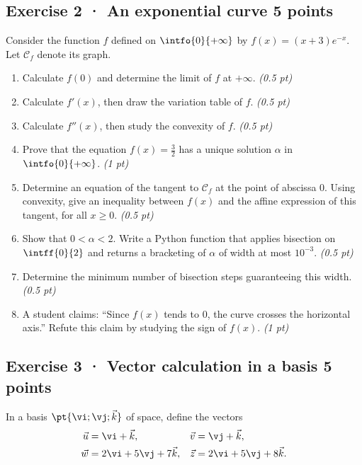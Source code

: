 \subsection*{Exercise 2 · An exponential curve \hfill 5 points}Consider the function $f$ defined on $\intfo{0}{+\infty}$ by $f(x)=(x+3)e^{-x}$. Let $\mathcal C_f$ denote its graph.

\begin{enumerate}

\item Calculate $f(0)$ and determine the limit of $f$ at $+\infty$. \hfill\textit{(0.5 pt)}

\item Calculate $f' (x)$, then draw the variation table of $f$. \hfill\textit{(0.5 pt)}

\item Calculate $f'' (x)$, then study the convexity of $f$. \hfill\textit{(0.5 pt)}

\item Prove that the equation $f(x)=\frac{3}{2}$ has a unique solution $\alpha$ in $\intfo{0}{+\infty}$. \hfill\textit{(1 pt)}

\item Determine an equation of the tangent to $\mathcal C_f$ at the point of abscissa $0$. Using convexity, give an inequality between $f(x)$ and the affine expression of this tangent, for all $x\ge0$. \hfill\textit{(0.5 pt)}

\item Show that $0<\alpha<2$. Write a Python function that applies bisection on $\intff{0}{2}$ and returns a bracketing of $\alpha$ of width at most $10^{-3}$. \hfill\textit{(0.5 pt)}

\item Determine the minimum number of bisection steps guaranteeing this width. \hfill\textit{(0.5 pt)}

\item A student claims: ``Since $f(x)$ tends to $0$, the curve crosses the horizontal axis.'' Refute this claim by studying the sign of $f(x)$. \hfill\textit{(1 pt)}

\end{enumerate}

\mxnewpage{}

\subsection*{Exercise 3 · Vector calculation in a basis \hfill 5 points}In a basis $\pt{\vi;\vj;\vec k}$ of space, define the vectors
\[\begin{aligned}\vec u&=\vi+\vec k,&\vec v&=\vj+\vec k,\\
\vec w&=2\vi+5\vj+7\vec k,&\vec z&=2\vi+5\vj+8\vec k.\end{aligned}\]

